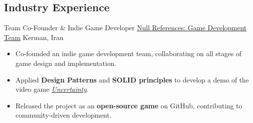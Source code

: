 \documentclass[10pt,a4paper,sans]{moderncv}        %
\begin{document}
\subsection{Industry Experience}

  {Team Co-Founder \& Indie Game Developer}
  {\href{https://github.com/NullReferences}{Null References: Game Development Team}}
  {Kerman, Iran}
  {}
  {\begin{itemize}%
    \item Co-founded an indie game development team, collaborating on all stages of game design and implementation.  
    \item Applied \textbf{Design Patterns} and \textbf{SOLID principles} to develop a demo of the video game \href{https://benymaxparsa.github.io/industry/}{\textit{Uncertainty}}.  
    \item Released the project as an \textbf{open-source game} on GitHub, contributing to community-driven development.  
  \end{itemize}}
\end{document}
